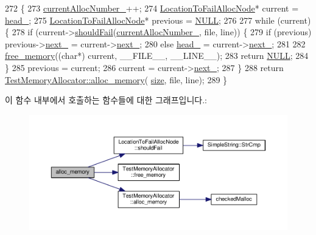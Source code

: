 \begin{DoxyCode}
272 \{
273     \hyperlink{class_failable_memory_allocator_ac565cda74c1659a4c2400f97a8a0872b}{currentAllocNumber\_}++;
274     \hyperlink{class_location_to_fail_alloc_node}{LocationToFailAllocNode}* current = \hyperlink{class_failable_memory_allocator_abca7541fbe80c2313fd718d9f1244c42}{head\_};
275     \hyperlink{class_location_to_fail_alloc_node}{LocationToFailAllocNode}* previous = \hyperlink{openavb__types__base__pub_8h_a070d2ce7b6bb7e5c05602aa8c308d0c4}{NULL};
276 
277     \textcolor{keywordflow}{while} (current) \{
278       \textcolor{keywordflow}{if} (current->\hyperlink{class_location_to_fail_alloc_node_a2690f4527e513193a643ef3aed06e3e5}{shouldFail}(\hyperlink{class_failable_memory_allocator_ac565cda74c1659a4c2400f97a8a0872b}{currentAllocNumber\_}, file, line)) \{
279         \textcolor{keywordflow}{if} (previous) previous->\hyperlink{class_location_to_fail_alloc_node_a1d488315b4672de363b3dd44df78f2e8}{next\_} = current->\hyperlink{class_location_to_fail_alloc_node_a1d488315b4672de363b3dd44df78f2e8}{next\_};
280         \textcolor{keywordflow}{else} \hyperlink{class_failable_memory_allocator_abca7541fbe80c2313fd718d9f1244c42}{head\_} = current->\hyperlink{class_location_to_fail_alloc_node_a1d488315b4672de363b3dd44df78f2e8}{next\_};
281 
282         \hyperlink{class_test_memory_allocator_a529ac9813d3b0836ce0b964449942534}{free\_memory}((\textcolor{keywordtype}{char}*) current, \_\_FILE\_\_, \_\_LINE\_\_);
283         \textcolor{keywordflow}{return} \hyperlink{openavb__types__base__pub_8h_a070d2ce7b6bb7e5c05602aa8c308d0c4}{NULL};
284       \}
285       previous = current;
286       current = current->\hyperlink{class_location_to_fail_alloc_node_a1d488315b4672de363b3dd44df78f2e8}{next\_};
287     \}
288     \textcolor{keywordflow}{return} \hyperlink{class_test_memory_allocator_a2ebbde51a1d514c74e9e2a09a21b0624}{TestMemoryAllocator::alloc\_memory}(
      \hyperlink{gst__avb__playbin_8c_a439227feff9d7f55384e8780cfc2eb82}{size}, file, line);
289 \}
\end{DoxyCode}


이 함수 내부에서 호출하는 함수들에 대한 그래프입니다.\+:
\nopagebreak
\begin{figure}[H]
\begin{center}
\leavevmode
\includegraphics[width=350pt]{class_failable_memory_allocator_a2ebbde51a1d514c74e9e2a09a21b0624_cgraph}
\end{center}
\end{figure}


